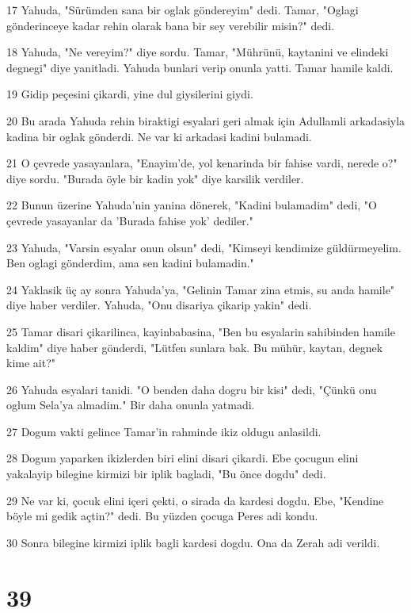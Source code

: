 \par 17 Yahuda, "Sürümden sana bir oglak göndereyim" dedi. Tamar, "Oglagi gönderinceye kadar rehin olarak bana bir sey verebilir misin?" dedi.
\par 18 Yahuda, "Ne vereyim?" diye sordu. Tamar, "Mührünü, kaytanini ve elindeki degnegi" diye yanitladi. Yahuda bunlari verip onunla yatti. Tamar hamile kaldi.
\par 19 Gidip peçesini çikardi, yine dul giysilerini giydi.
\par 20 Bu arada Yahuda rehin biraktigi esyalari geri almak için Adullamli arkadasiyla kadina bir oglak gönderdi. Ne var ki arkadasi kadini bulamadi.
\par 21 O çevrede yasayanlara, "Enayim'de, yol kenarinda bir fahise vardi, nerede o?" diye sordu. "Burada öyle bir kadin yok" diye karsilik verdiler.
\par 22 Bunun üzerine Yahuda'nin yanina dönerek, "Kadini bulamadim" dedi, "O çevrede yasayanlar da 'Burada fahise yok' dediler."
\par 23 Yahuda, "Varsin esyalar onun olsun" dedi, "Kimseyi kendimize güldürmeyelim. Ben oglagi gönderdim, ama sen kadini bulamadin."
\par 24 Yaklasik üç ay sonra Yahuda'ya, "Gelinin Tamar zina etmis, su anda hamile" diye haber verdiler. Yahuda, "Onu disariya çikarip yakin" dedi.
\par 25 Tamar disari çikarilinca, kayinbabasina, "Ben bu esyalarin sahibinden hamile kaldim" diye haber gönderdi, "Lütfen sunlara bak. Bu mühür, kaytan, degnek kime ait?"
\par 26 Yahuda esyalari tanidi. "O benden daha dogru bir kisi" dedi, "Çünkü onu oglum Sela'ya almadim." Bir daha onunla yatmadi.
\par 27 Dogum vakti gelince Tamar'in rahminde ikiz oldugu anlasildi.
\par 28 Dogum yaparken ikizlerden biri elini disari çikardi. Ebe çocugun elini yakalayip bilegine kirmizi bir iplik bagladi, "Bu önce dogdu" dedi.
\par 29 Ne var ki, çocuk elini içeri çekti, o sirada da kardesi dogdu. Ebe, "Kendine böyle mi gedik açtin?" dedi. Bu yüzden çocuga Peres adi kondu.
\par 30 Sonra bilegine kirmizi iplik bagli kardesi dogdu. Ona da Zerah adi verildi.

\chapter{39}

